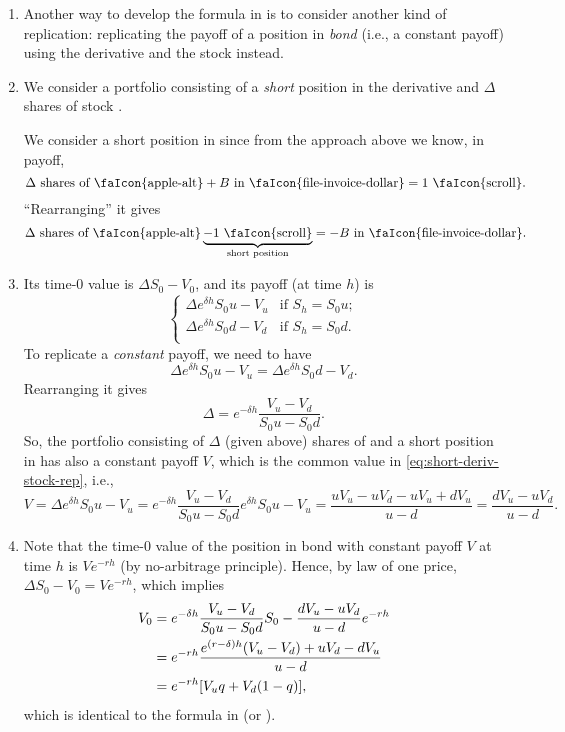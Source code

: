 \begin{enumerate}
\item Another way to develop the formula in  is
to consider another kind of replication: replicating the payoff of a position
in \emph{bond}  (i.e., a constant payoff) using the
derivative  and the stock  instead.

\item We consider a portfolio consisting of a \emph{short} position in the
derivative  and \(\Delta\) shares of stock .
\begin{intuition}
We consider a short position in  since from the approach above
we know, in payoff,
\[
\text{\(\Delta\) shares of \faIcon{apple-alt}} + \text{\(B\) in
\faIcon{file-invoice-dollar}} = \text{1 \faIcon{scroll}}.
\]
``Rearranging'' it gives
\[
\text{\(\Delta\) shares of \faIcon{apple-alt}} \underbrace{- \text{1 \faIcon{scroll}}}_{\text{short position}}
= -\text{\(B\) in \faIcon{file-invoice-dollar}}.
\]
\end{intuition}

\item Its time-0 value is \(\Delta S_0-V_0\), and its payoff (at time \(h\)) is
\[
\begin{cases}
\Delta e^{\delta h}S_0u-V_u&\text{if }S_h=S_0u;\\
\Delta e^{\delta h}S_0d-V_d&\text{if }S_h=S_0d.\\
\end{cases}
\]
To replicate a \emph{constant} payoff, we need to have
\begin{equation}
\label{eq:short-deriv-stock-rep}
\Delta e^{\delta h}S_0u-V_u=\Delta e^{\delta h}S_0d-V_d.
\end{equation}
Rearranging it gives
\[
\Delta=e^{-\delta h}\frac{V_u-V_d}{S_0u-S_0d}.
\]
So, the portfolio consisting of \(\Delta\) (given above) shares of
 and a short position in  has also a constant
payoff \(V\), which is the common value in \cref{eq:short-deriv-stock-rep}, i.e.,
\[
V=\Delta e^{\delta h}S_0u-V_u
=e^{-\delta h}\frac{V_u-V_d}{S_0u-S_0d}e^{\delta h}S_0u-V_u
=\frac{uV_u-uV_d-uV_u+dV_u}{u-d}
=\frac{dV_u-uV_d}{u-d}.
\]

\item Note that the time-0 value of the position in bond with constant payoff
\(V\) at time \(h\) is \(Ve^{-rh}\) (by no-arbitrage principle). Hence, by law
of one price, \(\Delta S_0-V_0=Ve^{-rh}\), which implies
\begin{align*}
V_0&=e^{-\delta h}\frac{V_u-V_d}{S_0u-S_0d}S_0-\frac{dV_u-uV_d}{u-d}e^{-rh} \\
&=e^{-rh}\frac{e^{(r-\delta)h}(V_u-V_d)+uV_d-dV_u}{u-d} \\
&=e^{-rh}\qty[V_uq+V_d(1-q)],
\end{align*}
which is identical to the formula in  (or
).
\end{enumerate}

